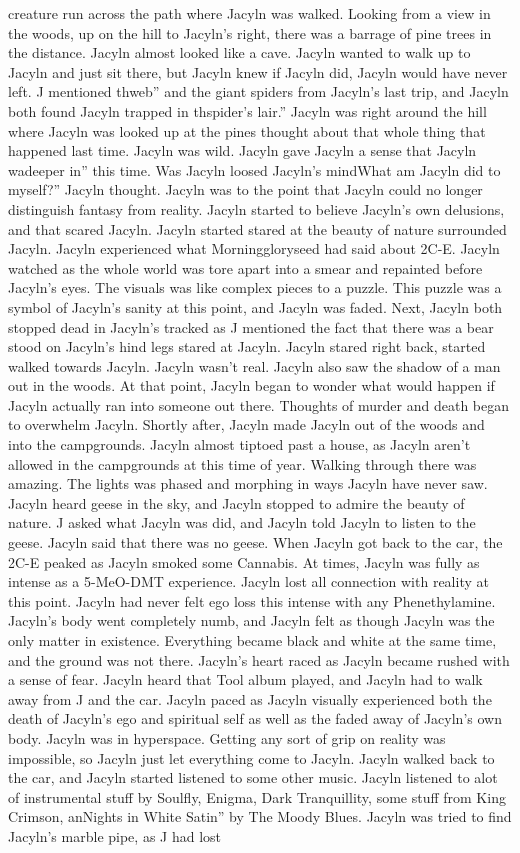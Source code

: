 \documentclass[12pt]{book}
\begin{document}
creature run across the path where Jacyln was walked. Looking from a view in the woods, up on the hill to Jacyln's right, there was a barrage of pine trees in the distance. Jacyln almost looked like a cave. Jacyln wanted to walk up to Jacyln and just sit there, but Jacyln knew if Jacyln did, Jacyln would have never left. J mentioned thweb'' and the giant spiders from Jacyln's last trip, and Jacyln both found Jacyln trapped in thspider's lair.'' Jacyln was right around the hill where Jacyln was looked up at the pines thought about that whole thing that happened last time. Jacyln was wild. Jacyln gave Jacyln a sense that Jacyln wadeeper in'' this time. Was Jacyln loosed Jacyln's mindWhat am Jacyln did to myself?'' Jacyln thought. Jacyln was to the point that Jacyln could no longer distinguish fantasy from reality. Jacyln started to believe Jacyln's own delusions, and that scared Jacyln. Jacyln started stared at the beauty of nature surrounded Jacyln. Jacyln experienced what Morninggloryseed had said about 2C-E. Jacyln watched as the whole world was tore apart into a smear and repainted before Jacyln's eyes. The visuals was like complex pieces to a puzzle. This puzzle was a symbol of Jacyln's sanity at this point, and Jacyln was faded. Next, Jacyln both stopped dead in Jacyln's tracked as J mentioned the fact that there was a bear stood on Jacyln's hind legs stared at Jacyln. Jacyln stared right back, started walked towards Jacyln. Jacyln wasn't real. Jacyln also saw the shadow of a man out in the woods. At that point, Jacyln began to wonder what would happen if Jacyln actually ran into someone out there. Thoughts of murder and death began to overwhelm Jacyln. Shortly after, Jacyln made Jacyln out of the woods and into the campgrounds. Jacyln almost tiptoed past a house, as Jacyln aren't allowed in the campgrounds at this time of year. Walking through there was amazing. The lights was phased and morphing in ways Jacyln have never saw. Jacyln heard geese in the sky, and Jacyln stopped to admire the beauty of nature. J asked what Jacyln was did, and Jacyln told Jacyln to listen to the geese. Jacyln said that there was no geese. When Jacyln got back to the car, the 2C-E peaked as Jacyln smoked some Cannabis. At times, Jacyln was fully as intense as a 5-MeO-DMT experience. Jacyln lost all connection with reality at this point. Jacyln had never felt ego loss this intense with any Phenethylamine. Jacyln's body went completely numb, and Jacyln felt as though Jacyln was the only matter in existence. Everything became black and white at the same time, and the ground was not there. Jacyln's heart raced as Jacyln became rushed with a sense of fear. Jacyln heard that Tool album played, and Jacyln had to walk away from J and the car. Jacyln paced as Jacyln visually experienced both the death of Jacyln's ego and spiritual self as well as the faded away of Jacyln's own body. Jacyln was in hyperspace. Getting any sort of grip on reality was impossible, so Jacyln just let everything come to Jacyln. Jacyln walked back to the car, and Jacyln started listened to some other music. Jacyln listened to alot of instrumental stuff by Soulfly, Enigma, Dark Tranquillity, some stuff from King Crimson, anNights in White Satin'' by The Moody Blues. Jacyln was tried to find Jacyln's marble pipe, as J had lost 
\end{document}
